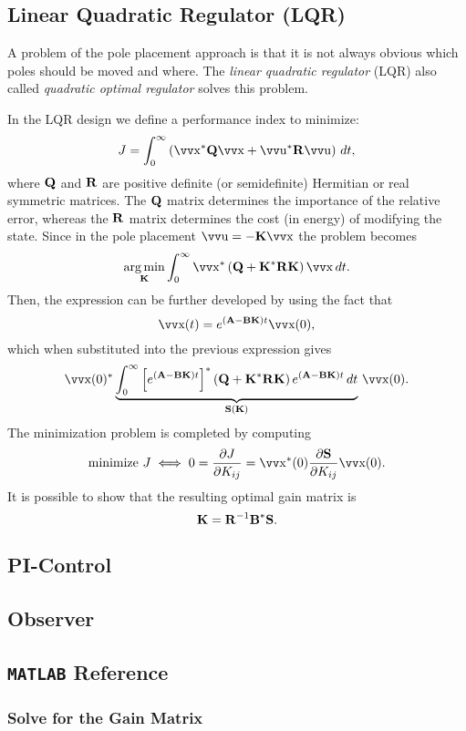 \subsection{Linear Quadratic Regulator (LQR)}

A problem of the pole placement approach is that it is not always obvious which poles should be moved and where. The \emph{linear quadratic regulator} (LQR) also called \emph{quadratic optimal regulator} solves this problem.

In the LQR design we define a performance index to minimize:
\[
	J = \int_0^\infty \left(
		\vec{x}^* \mx{Q} \vec{x} + \vec{u}^* \mx{R} \vec{u}
	\right) \, dt,
\]
where \(\bm{\mathrm{Q}}\) and \(\bm{\mathrm{R}}\) are positive definite (or semidefinite) Hermitian or real symmetric matrices. The \(\bm{\mathrm{Q}}\) matrix determines the importance of the relative error, whereas the \(\bm{\mathrm{R}}\) matrix determines the cost (in energy) of modifying the state.  Since in the pole placement \(\vec{u} = -\mx{K}\vec{x}\) the problem becomes
\[
	\argmin_{\mx{K}}
	\int_0^\infty \vec{x}^* \left(
		\mx{Q} + \mx{K}^* \mx{R} \mx{K}
	\right) \vec{x} \, dt.
\]
Then, the expression can be further developed by using the fact that
\[
	\vec{x}(t) = e^{(\mx{A} - \mx{B}\mx{K}) t} \vec{x}(0),
\]
which when substituted into the previous expression gives
\[
	\vec{x}(0)^* \underbrace{\int_0^\infty \left[
			e^{(\mx{A} - \mx{B}\mx{K}) t}
		\right]^* \left(
			\mx{Q} + \mx{K}^* \mx{R} \mx{K}
		\right) e^{(\mx{A} - \mx{B}\mx{K}) t}
		\, dt}_{\mx{S}(\mx{K})}
	\, \vec{x}(0).
\]
The minimization problem is completed by computing
\[
	\text{minimize } J \iff
	0 = \frac{\partial J}{\partial K_{ij}} =
	\vec{x}^*(0) \frac{\partial \mx{S}}{\partial K_{ij}} \vec{x}(0).
\]
It is possible to show that the resulting optimal gain matrix is
\[
	\bm{\mathrm{K}} = \bm{\mathrm{R}}^{-1} \bm{\mathrm{B}}^* \bm{\mathrm{S}}.
\]

\subsection{PI-Control}

\subsection{Observer}

\subsection{\texttt{MATLAB} Reference}

\subsubsection{Solve for the Gain Matrix}
